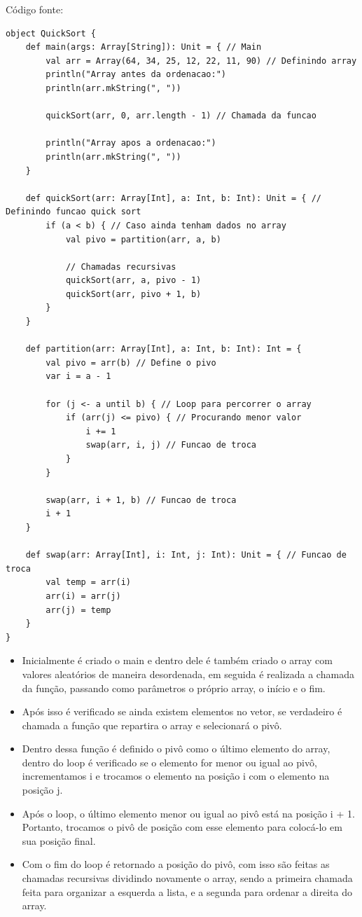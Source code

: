     Código fonte:
    
    \begin{lstlisting}[breaklines]
object QuickSort {
	def main(args: Array[String]): Unit = { // Main
		val arr = Array(64, 34, 25, 12, 22, 11, 90) // Definindo array
		println("Array antes da ordenacao:")
		println(arr.mkString(", "))
		
		quickSort(arr, 0, arr.length - 1) // Chamada da funcao
		
		println("Array apos a ordenacao:")
		println(arr.mkString(", "))
	}
	
	def quickSort(arr: Array[Int], a: Int, b: Int): Unit = { // Definindo funcao quick sort
		if (a < b) { // Caso ainda tenham dados no array
			val pivo = partition(arr, a, b)
			
			// Chamadas recursivas
			quickSort(arr, a, pivo - 1)
			quickSort(arr, pivo + 1, b)
		}
	}
	
	def partition(arr: Array[Int], a: Int, b: Int): Int = {
		val pivo = arr(b) // Define o pivo
		var i = a - 1 
		
		for (j <- a until b) { // Loop para percorrer o array
			if (arr(j) <= pivo) { // Procurando menor valor
				i += 1
				swap(arr, i, j) // Funcao de troca
			}
		}
		
		swap(arr, i + 1, b) // Funcao de troca
		i + 1
	}
	
	def swap(arr: Array[Int], i: Int, j: Int): Unit = { // Funcao de troca
		val temp = arr(i)
		arr(i) = arr(j)
		arr(j) = temp
	}
}
    \end{lstlisting}

	\begin{itemize}
		\item Inicialmente é criado o main e dentro dele é também criado o array com valores aleatórios de maneira desordenada, em seguida é realizada a chamada da função, passando como parâmetros o próprio array, o início e o fim.
		
		\item Após isso é verificado se ainda existem elementos no vetor, se verdadeiro é chamada a função que repartira o array e selecionará o pivô.
		
		\item Dentro dessa função é definido o pivô como o último elemento do array, dentro do loop é verificado se o elemento for menor ou igual ao pivô, incrementamos i e trocamos o elemento na posição i com o elemento na posição j.
		
		\item Após o loop, o último elemento menor ou igual ao pivô está na posição i + 1. Portanto, trocamos o pivô de posição com esse elemento para colocá-lo em sua posição final.
		
		\item Com o fim do loop é retornado a posição do pivô, com isso são feitas as chamadas recursivas dividindo novamente o array, sendo a primeira chamada feita para organizar a esquerda a lista, e a segunda para ordenar a direita do array.
	\end{itemize}


